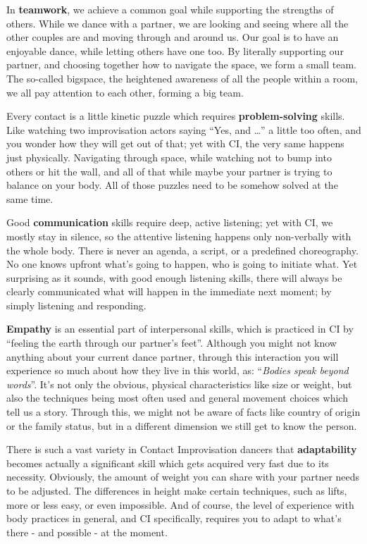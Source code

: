 In \textbf{teamwork}, we achieve a common goal while supporting the strengths of others.
While we dance with a partner, we are looking and seeing where all the other couples are and moving through and around us.
Our goal is to have an enjoyable dance, while letting others have one too.
By literally supporting our partner, and choosing together how to navigate the space, we form a small team.
The so-called \gls{bigspace}, the heightened awareness of all the people within a room, we all pay attention to each other, forming a big team.

Every contact is a little kinetic puzzle which requires \textbf{problem-solving} skills.
Like watching two improvisation actors saying ``Yes, and \ldots'' a little too often, and you wonder how they will get out of that; yet with CI, the very same happens just physically.
Navigating through space, while watching not to bump into others or hit the wall, and all of that while maybe your partner is trying to balance on your body.
All of those puzzles need to be somehow solved at the same time.

Good \textbf{communication} skills require deep, active listening;
yet with CI, we mostly stay in silence, so the attentive listening happens only non-verbally with the whole body.
There is never an agenda, a script, or a predefined choreography.
No one knows upfront what's going to happen, who is going to initiate what.
Yet surprising as it sounds, with good enough listening skills, there will always be clearly communicated what will happen in the immediate next moment; by simply listening and responding.

\textbf{Empathy} is an essential part of interpersonal skills, which is practiced in CI by ``feeling the earth through our partner's feet''.
Although you might not know anything about your current dance partner, through this interaction you will experience so much about how they live in this world, as: ``\textit{Bodies speak beyond words}''.
It's not only the obvious, physical characteristics like size or weight, but also the techniques being most often used and general movement choices which tell us a story.
Through this, we might not be aware of facts like country of origin or the family status, but in a different dimension we still get to know the person.

There is such a vast variety in Contact Improvisation dancers that \textbf{adaptability} becomes actually a significant skill which gets acquired very fast due to its necessity.
Obviously, the amount of weight you can share with your partner needs to be adjusted.
The differences in height make certain techniques, such as lifts, more or less easy, or even impossible.
And of course, the level of experience with body practices in general, and CI specifically, requires you to adapt to what's there - and possible - at the moment.


